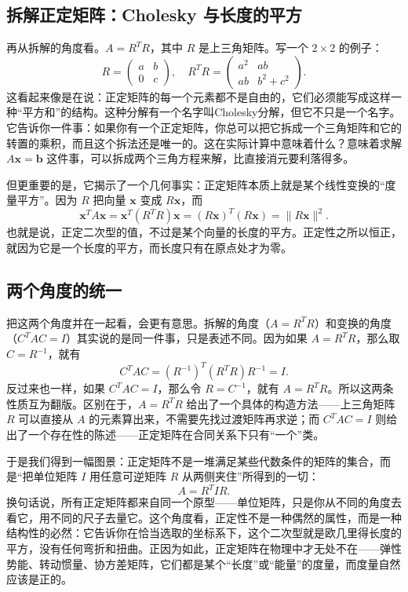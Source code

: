 \documentclass[UTF8]{ctexbook}
\begin{document}
\subsection{拆解正定矩阵：Cholesky 与长度的平方}

再从拆解的角度看。\(A = R^T R\)，其中 \(R\) 是上三角矩阵。写一个 \(2\times 2\) 的例子：
\[
R = \begin{pmatrix} a & b \\ 0 & c \end{pmatrix},
\quad
R^T R = \begin{pmatrix} a^2 & ab \\ ab & b^2+c^2 \end{pmatrix}.
\]
这看起来像是在说：正定矩阵的每一个元素都不是自由的，它们必须能写成这样一种“平方和”的结构。这种分解有一个名字叫Cholesky分解，但它不只是一个名字。它告诉你一件事：如果你有一个正定矩阵，你总可以把它拆成一个三角矩阵和它的转置的乘积，而且这个拆法还是唯一的。这在实际计算中意味着什么？意味着求解 \(A\mathbf{x}=\mathbf{b}\) 这件事，可以拆成两个三角方程来解，比直接消元要利落得多。

但更重要的是，它揭示了一个几何事实：正定矩阵本质上就是某个线性变换的“度量平方”。因为 \(R\) 把向量 \(\mathbf{x}\) 变成 \(R\mathbf{x}\)，而
\[
\mathbf{x}^T A\mathbf{x} = \mathbf{x}^T (R^T R) \mathbf{x} = (R\mathbf{x})^T (R\mathbf{x}) = \|R\mathbf{x}\|^2.
\]
也就是说，正定二次型的值，不过是某个向量的长度的平方。正定性之所以恒正，就因为它是一个长度的平方，而长度只有在原点处才为零。

\subsection{两个角度的统一}

把这两个角度并在一起看，会更有意思。拆解的角度（\(A = R^T R\)）和变换的角度（\(C^T A C = I\)）其实说的是同一件事，只是表述不同。因为如果 \(A = R^T R\)，那么取 \(C = R^{-1}\)，就有
\[
C^T A C = (R^{-1})^T (R^T R) R^{-1} = I.
\]
反过来也一样，如果 \(C^T A C = I\)，那么令 \(R = C^{-1}\)，就有 \(A = R^T R\)。所以这两条性质互为翻版。区别在于，\(A = R^T R\) 给出了一个具体的构造方法——上三角矩阵 \(R\) 可以直接从 \(A\) 的元素算出来，不需要先找过渡矩阵再求逆；而 \(C^T A C = I\) 则给出了一个存在性的陈述——正定矩阵在合同关系下只有“一个”类。

于是我们得到一幅图景：正定矩阵不是一堆满足某些代数条件的矩阵的集合，而是“把单位矩阵 \(I\) 用任意可逆矩阵 \(R\) 从两侧夹住”所得到的一切：
\[
A = R^T I R.
\]
换句话说，所有正定矩阵都来自同一个原型——单位矩阵，只是你从不同的角度去看它，用不同的尺子去量它。这个角度看，正定性不是一种偶然的属性，而是一种结构性的必然：它告诉你在恰当选取的坐标系下，这个二次型就是欧几里得长度的平方，没有任何弯折和扭曲。正因为如此，正定矩阵在物理中才无处不在——弹性势能、转动惯量、协方差矩阵，它们都是某个“长度”或“能量”的度量，而度量自然应该是正的。
\end{document}
